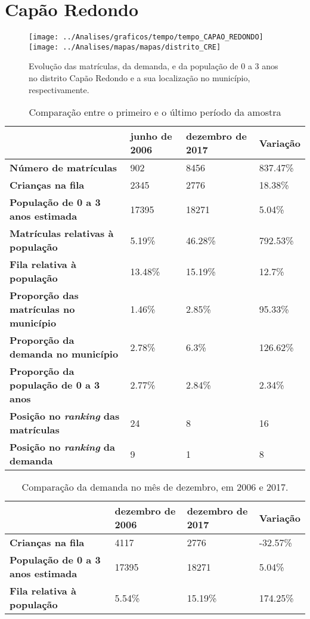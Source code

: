 \section{Capão Redondo}
\begin{figure}[H]
\centering
\texttt{[image: ../Analises/graficos/tempo/tempo\_CAPAO\_REDONDO]}
\texttt{[image: ../Analises/mapas/mapas/distrito\_CRE]}
\caption{Evolução das matrículas, da demanda, e da população de 0 a 3 anos no distrito Capão Redondo e a sua localização no município, respectivamente.}
\end{figure}
\begin{table}[H]
\begin{tabular}{l|l|l|l}
\textbf{}                                      & \textbf{junho de 2006}       & \textbf{dezembro de 2017}    & \textbf{Variação} \\ \hline
\textbf{Número de matrículas}                  & 902 & 8456 & 837.47\% \\ \hline
\textbf{Crianças na fila}                      & 2345 & 2776 & 18.38\% \\ \hline
\textbf{População de 0 a 3 anos estimada}      & 17395 & 18271 & 5.04\% \\ \hline
\textbf{Matrículas relativas à população}      & 5.19\% & 46.28\% & 792.53\% \\ \hline
\textbf{Fila relativa à população}             & 13.48\% & 15.19\% & 12.7\% \\ \hline
\textbf{Proporção das matrículas no município} & 1.46\% & 2.85\% & 95.33\% \\ \hline
\textbf{Proporção da demanda no município}     & 2.78\% & 6.3\% & 126.62\% \\ \hline
\textbf{Proporção da população de 0 a 3 anos}  & 2.77\% & 2.84\% & 2.34\% \\ \hline
\textbf{Posição no \textit{ranking} das matrículas}     & 24 & 8 & 16 \\ \hline
\textbf{Posição no \textit{ranking} da demanda}         & 9 & 1 & 8 \\ 
\end{tabular}
\caption{Comparação entre o primeiro e o último período da amostra}
\end{table}
\begin{table}[H]
\begin{tabular}{l|l|l|l}
\textbf{}                                 & \textbf{dezembro de 2006} & \textbf{dezembro de 2017} & \textbf{Variação} \\ \hline
\textbf{Crianças na fila}                      & 4117 & 2776 & -32.57\% \\ \hline
\textbf{População de 0 a 3 anos estimada}      & 17395 & 18271 & 5.04\% \\ \hline
\textbf{Fila relativa à população}             & 5.54\% & 15.19\% & 174.25\% \\
\end{tabular}
\caption{Comparação da demanda no mês de dezembro, em 2006 e 2017.}
\end{table}
